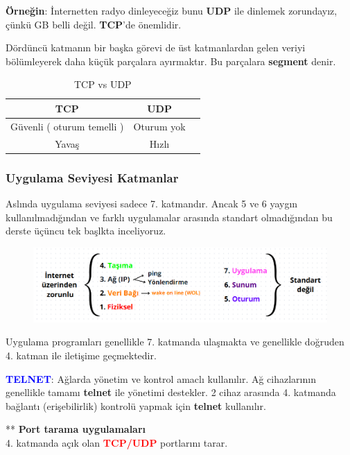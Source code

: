 \textbf{Örneğin}: İnternetten radyo dinleyeceğiz bunu \textbf{UDP} ile dinlemek zorundayız, çünkü GB belli değil.
\textbf{TCP}'de önemlidir.

\tab Dördüncü katmanın bir başka görevi de üst katmanlardan gelen veriyi bölümleyerek daha küçük parçalara ayırmaktır.
Bu parçalara \textbf{segment} denir.

\begin{table}[ht]
	\centering
	\begin{tabular}{|c|c|c|}
		\hline
		TCP                      & UDP        \\
		\hline
		Güvenli ( oturum temelli ) & Oturum yok \\
		\hline
		Yavaş                      & Hızlı      \\
		\hline
	\end{tabular}
	\caption{TCP vs UDP}
	\label{tab:tcp_vs_upd}
\end{table}

\subsubsection{Uygulama Seviyesi Katmanlar}\label{subsubsec:application_model}
Aslında uygulama seviyesi sadece 7. katmandır.
Ancak 5 ve 6 yaygın kullanılmadığından ve farklı uygulamalar arasında standart olmadığından bu derste üçüncu tek başlkta inceliyoruz.
\begin{figure}[!ht]
	\centering
	\includegraphics[width=17cm]{images/osi_example}
\end{figure}
Uygulama programları genellikle 7. katmanda ulaşmakta ve genellikle doğruden 4. katman ile iletişime geçmektedir.

\textbf{\textcolor{blue}{TELNET}}: Ağlarda yönetim ve kontrol amaclı kullanılır.
Ağ cihazlarının genellikle tamamı \textbf{telnet} ile yönetimi destekler.
2 cihaz arasında 4. katmanda bağlantı (erişebilirlik) kontrolü yapmak için \textbf{telnet} kullanılır.

** \textbf{Port tarama uygulamaları}\\
4. katmanda açık olan \textbf{\textcolor{red}{TCP/UDP}} portlarını tarar.


